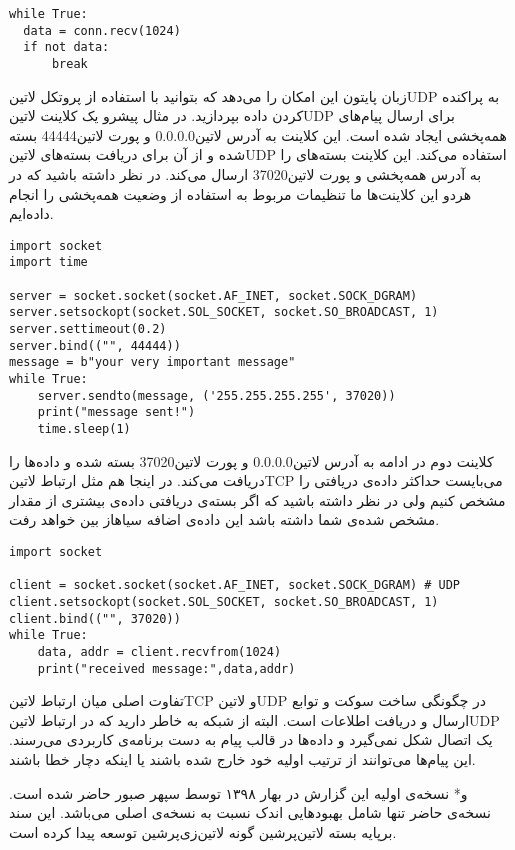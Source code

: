 \documentclass[]{article}
\begin{document}
  \begin{latin}
  \begin{verbatim}
while True:
  data = conn.recv(1024)
  if not data:
      break
  \end{verbatim}
  \end{latin}

  زبان پایتون این امکان را می‌دهد که بتوانید با استفاده از پروتکل ‌لاتین{UDP} به پراکنده کردن داده بپردازید.
  در مثال پیشرو یک کلاینت ‌لاتین{UDP} برای ارسال پیام‌های همه‌پخشی ایجاد شده است.
  این کلاینت به آدرس ‌لاتین{0.0.0.0} و پورت ‌لاتین{44444} بسته شده و از آن برای دریافت بسته‌های ‌لاتین{UDP} استفاده می‌کند.
  این کلاینت بسته‌های را به آدرس همه‌پخشی و پورت ‌لاتین{37020} ارسال می‌کند.
  در نظر داشته باشید که در هردو این کلاینت‌ها ما تنظیمات مربوط به استفاده از وضعیت همه‌پخشی را انجام داده‌ایم.

  \begin{latin}
  \begin{verbatim}
import socket
import time

server = socket.socket(socket.AF_INET, socket.SOCK_DGRAM)
server.setsockopt(socket.SOL_SOCKET, socket.SO_BROADCAST, 1)
server.settimeout(0.2)
server.bind(("", 44444))
message = b"your very important message"
while True:
    server.sendto(message, ('255.255.255.255', 37020))
    print("message sent!")
    time.sleep(1)
  \end{verbatim}
  \end{latin}

  کلاینت دوم در ادامه به آدرس ‌لاتین{0.0.0.0} و پورت ‌لاتین{37020} بسته شده و داده‌ها را دریافت می‌کند.
  در اینجا هم مثل ارتباط ‌لاتین{TCP} می‌بایست حداکثر داده‌ی دریافتی را مشخص کنیم ولی در نظر داشته باشید که اگر بسته‌ی دریافتی
  داده‌ی بیشتری از مقدار مشخص شده‌ی شما داشته باشد این داده‌ی اضافه ‌سیاه{از بین خواهد رفت}.

  \begin{latin}
  \begin{verbatim}
import socket

client = socket.socket(socket.AF_INET, socket.SOCK_DGRAM) # UDP
client.setsockopt(socket.SOL_SOCKET, socket.SO_BROADCAST, 1)
client.bind(("", 37020))
while True:
    data, addr = client.recvfrom(1024)
    print("received message:",data,addr)
  \end{verbatim}
  \end{latin}

  تفاوت اصلی میان ارتباط ‌لاتین{TCP} و ‌لاتین{UDP} در چگونگی ساخت سوکت و توابع ارسال و دریافت اطلاعات است.
  البته از شبکه به خاطر دارید که در ارتباط ‌لاتین{UDP} یک اتصال شکل نمی‌گیرد
  و داده‌ها در قالب پیام به دست برنامه‌ی کاربردی می‌رسند.
  این پیام‌ها می‌توانند از ترتیب اولیه خود خارج شده باشند یا اینکه دچار خطا باشند.

  ‌و*{}
  نسخه‌ی اولیه این گزارش در بهار ۱۳۹۸ توسط سپهر صبور حاضر شده است. نسخه‌ی حاضر تنها شامل بهبودهایی اندک نسبت به نسخه‌ی اصلی می‌باشد.
  این سند برپایه بسته ‌لاتین{‌پرشین} گونه ‌لاتین{‌زی‌پرشین} توسعه پیدا کرده است.
\end{document}
